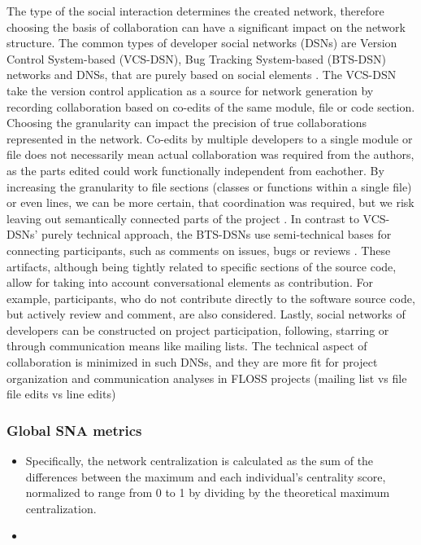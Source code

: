 The type of the social interaction determines the created network, therefore choosing the basis of collaboration can have a significant impact on the network structure. The common types of developer social networks (DSNs) are Version Control System-based (VCS-DSN), Bug Tracking System-based (BTS-DSN) networks and DNSs, that are purely based on social elements \cite{aljemabiEmpiricalStudyEvolution2018}. The VCS-DSN take the version control application as a source for network generation by recording collaboration based on co-edits of the same module, file or code section. Choosing the granularity can impact the precision of true collaborations represented in the network. Co-edits by multiple developers to a single module or file does not necessarily mean actual collaboration was required from the authors, as the parts edited could work functionally independent from eachother. By increasing the granularity to file sections (classes or functions within a single file) or even lines, we can be more certain, that coordination was required, but we risk leaving out semantically connected parts of the project \cite{joblinEvolutionaryTrendsDeveloper2017}. In contrast to VCS-DSNs' purely technical approach, the BTS-DSNs use semi-technical bases for connecting participants, such as comments on issues, bugs or reviews \cite{elasriPeripheryCoreTemporal2017}. These artifacts, although being tightly related to specific sections of the source code, allow for taking into account conversational elements as contribution. For example, participants, who do not contribute directly to the software source code, but actively review and comment, are also considered. Lastly, social networks of developers can be constructed on project participation, following, starring or through communication means like mailing lists. The technical aspect of collaboration is minimized in such DNSs, and they are more fit for project organization and communication analyses in FLOSS projects (mailing list vs file file edits vs line edits) \\


\subsubsection{Global SNA metrics}
\begin{itemize}
    \item Specifically, the network centralization is calculated as the sum of the differences between the maximum and each individual's centrality score, normalized to range from 0 to 1 by dividing by the 
    theoretical maximum centralization.  \cite{crowstonHierarchyCentralizationFree2006}
    \item \cite{klugUnderstandingGroupDynamics}
\end{itemize}

